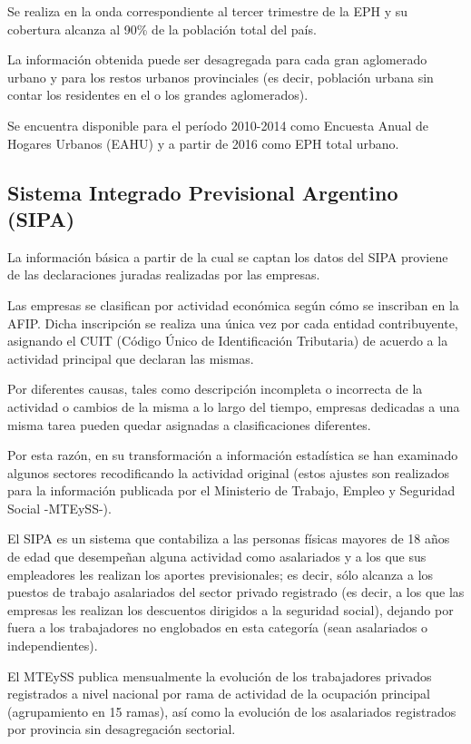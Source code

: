 \documentclass[
  openany]{book}
\begin{document}
Se realiza en la onda correspondiente al tercer trimestre de la EPH y su cobertura alcanza al 90\% de la población total del país.

La información obtenida puede ser desagregada para cada gran aglomerado urbano y para los restos urbanos provinciales (es decir, población urbana sin contar los residentes en el o los grandes aglomerados).

Se encuentra disponible para el período 2010-2014 como Encuesta Anual de Hogares Urbanos (EAHU) y a partir de 2016 como EPH total urbano.

\hypertarget{sistema-integrado-previsional-argentino-sipa}{%
\subsection{Sistema Integrado Previsional Argentino (SIPA)}\label{sistema-integrado-previsional-argentino-sipa}}

La información básica a partir de la cual se captan los datos del SIPA proviene de las declaraciones juradas realizadas por las empresas.

Las empresas se clasifican por actividad económica según cómo se inscriban en la AFIP.
Dicha inscripción se realiza una única vez por cada entidad contribuyente, asignando el CUIT (Código Único de Identificación Tributaria) de acuerdo a la actividad principal que declaran las mismas.

Por diferentes causas, tales como descripción incompleta o incorrecta de la actividad o cambios de la misma a lo largo del tiempo, empresas dedicadas a una misma tarea pueden quedar asignadas a clasificaciones diferentes.

Por esta razón, en su transformación a información estadística se han examinado algunos sectores recodificando la actividad original (estos ajustes son realizados para la información publicada por el Ministerio de Trabajo, Empleo y Seguridad Social -MTEySS-).

El SIPA es un sistema que contabiliza a las personas físicas mayores de 18 años de edad que desempeñan alguna actividad como asalariados y a los que sus empleadores les realizan los aportes previsionales; es decir, sólo alcanza a los puestos de trabajo asalariados del sector privado registrado (es decir, a los que las empresas les realizan los descuentos dirigidos a la seguridad social), dejando por fuera a los trabajadores no englobados en esta categoría (sean asalariados o independientes).

El MTEySS publica mensualmente la evolución de los trabajadores privados registrados a nivel nacional por rama de actividad de la ocupación principal (agrupamiento en 15 ramas), así como la evolución de los asalariados registrados por provincia sin desagregación sectorial.
\end{document}
